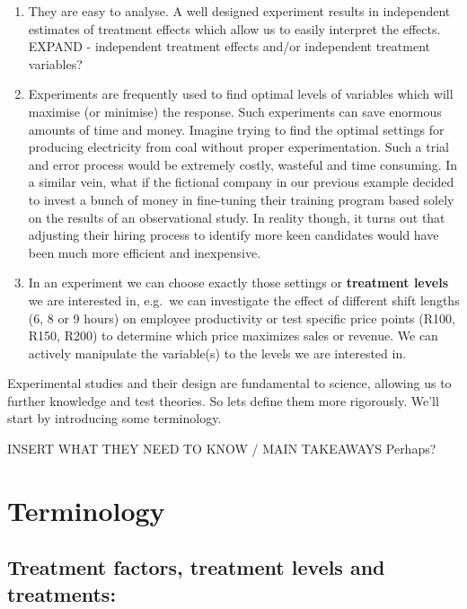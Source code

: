 \documentclass[
  letterpaper,
  DIV=11,
  numbers=noendperiod,
  oneside]{scrreprt}
\begin{document}
\begin{enumerate}
\def\labelenumi{\arabic{enumi}.}
\item
  They are easy to analyse. A well designed experiment results in
  independent estimates of treatment effects which allow us to easily
  interpret the effects. EXPAND - independent treatment effects and/or
  independent treatment variables?
\item
  Experiments are frequently used to find optimal levels of variables
  which will maximise (or minimise) the response. Such experiments can
  save enormous amounts of time and money. Imagine trying to find the
  optimal settings for producing electricity from coal without proper
  experimentation. Such a trial and error process would be extremely
  costly, wasteful and time consuming. In a similar vein, what if the
  fictional company in our previous example decided to invest a bunch of
  money in fine-tuning their training program based solely on the
  results of an observational study. In reality though, it turns out
  that adjusting their hiring process to identify more keen candidates
  would have been much more efficient and inexpensive.
\item
  In an experiment we can choose exactly those settings or
  \textbf{treatment levels} we are interested in, e.g.~we can
  investigate the effect of different shift lengths (6, 8 or 9 hours) on
  employee productivity or test specific price points (R100, R150, R200)
  to determine which price maximizes sales or revenue. We can actively
  manipulate the variable(s) to the levels we are interested in.
\end{enumerate}

Experimental studies and their design are fundamental to science,
allowing us to further knowledge and test theories. So lets define them
more rigorously. We'll start by introducing some terminology.

INSERT WHAT THEY NEED TO KNOW / MAIN TAKEAWAYS Perhaps?

\chapter{Terminology}\label{terminology}

\section*{\texorpdfstring{\textbf{Treatment factors, treatment levels
and
treatments:}}{Treatment factors, treatment levels and treatments:}}\label{treatment-factors-treatment-levels-and-treatments}
\end{document}
